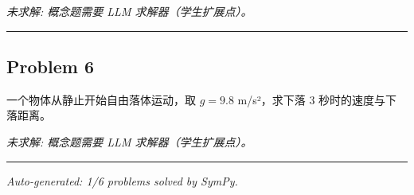 \documentclass[12pt, a4paper]{article}
\newcommand{\problem}[1]{\subsection*{Problem #1}}
\begin{document}
\textit{\color{red} 未求解: 概念题需要 LLM 求解器（学生扩展点）。}

\vspace{1em}
\hrule
\vspace{1em}

\problem{6}

一个物体从静止开始自由落体运动，取 $g = 9.8$ m/s²，求下落 3 秒时的速度与下落距离。

\textit{\color{red} 未求解: 概念题需要 LLM 求解器（学生扩展点）。}

\vspace{1em}
\hrule
\vspace{1em}


\vspace{2em}
\noindent\textit{Auto-generated: 1/6 problems solved by SymPy.}
\end{document}
